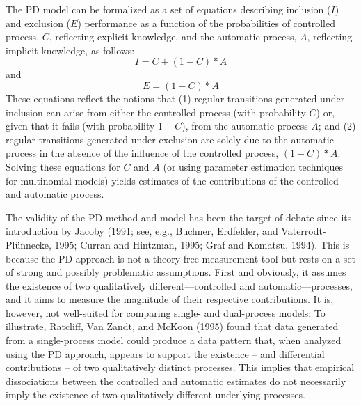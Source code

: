 \documentclass[english,,man]{apa6}
\begin{document}
The PD model can be formalized as a set of equations describing inclusion (\(I\)) and exclusion (\(E\)) performance as a function of the probabilities of controlled process, \(C\), reflecting explicit knowledge, and the automatic process, \(A\), reflecting implicit knowledge, as follows:
\[I=C+(1-C)*A\]
and
\[E=(1-C)*A\]
These equations reflect the notions that (1) regular transitions generated under inclusion can arise from either the controlled process (with probability \(C\)) or, given that it fails (with probability \(1-C\)), from the automatic process \(A\); and (2) regular transitions generated under exclusion are solely due to the automatic process in the absence of the influence of the controlled process, \((1-C)*A\).
Solving these equations for \(C\) and \(A\) (or using parameter estimation techniques for multinomial models) yields estimates of the contributions of the controlled and automatic process.

The validity of the PD method and model has been the target of debate since its introduction by Jacoby (1991; see, e.g., Buchner, Erdfelder, and Vaterrodt-Plünnecke, 1995; Curran and Hintzman, 1995; Graf and Komatsu, 1994).
This is because the PD approach is not a theory-free measurement tool but rests on a set of strong and possibly problematic assumptions.
First and obviously, it assumes the existence of two qualitatively different---controlled and automatic---processes, and it aims to measure the magnitude of their respective contributions.
It is, however, not well-suited for comparing single- and dual-process models:
To illustrate, Ratcliff, Van Zandt, and McKoon (1995) found that data generated from a single-process model could produce a data pattern that, when analyzed using the PD approach, appears to support the existence -- and differential contributions -- of two qualitatively distinct processes.
This implies that empirical dissociations between the controlled and automatic estimates do not necessarily imply the existence of two qualitatively different underlying processes.
\end{document}
